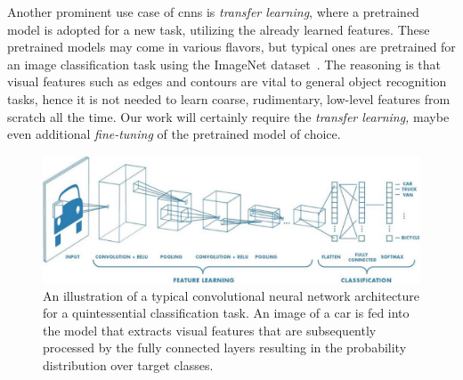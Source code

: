 Another prominent use case of \glspl{cnn} is \emph{transfer learning}, where a pretrained model is adopted for a new task, utilizing the already learned features. These pretrained models may come in various flavors, but typical ones are pretrained for an image classification task using the ImageNet dataset~\cite{JiaDeng2009}. The reasoning is that visual features such as edges and contours are vital to general object recognition tasks, hence it is not needed to learn coarse, rudimentary, low-level features from scratch all the time. Our work will certainly require the \emph{transfer learning,} maybe even additional \emph{fine-tuning} of the pretrained model of choice.

\begin{figure}[t]
    \centerline{\includegraphics[width=0.9\linewidth]{figures/theoretical_foundations/typical_cnn_architecture.pdf}}
    \caption[A typical CNN architecture]{An illustration of a typical convolutional neural network architecture for a quintessential classification task. An image of a car is fed into the model that extracts visual features that are subsequently processed by the fully connected layers resulting in the probability distribution over target classes. }
    \label{fig:TypicalCNNArchitecture}
\end{figure}
